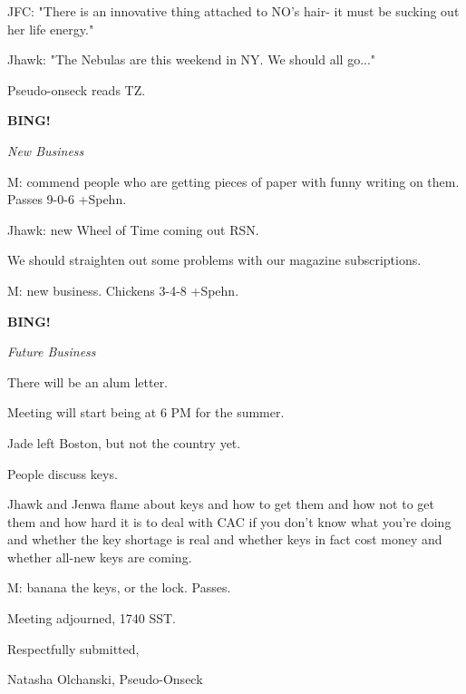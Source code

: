\documentclass[12pt]{article}
\newcommand{\bing}{{\bf BING!} }
\newcommand{\goto}[1]{\bing \vskip 12pt \centerline{{\em{#1}}}}
\begin{document}
JFC: "There is an innovative thing attached to NO's hair- it must be sucking out her life energy."

Jhawk: "The Nebulas are this weekend in NY. We should all go..."

Pseudo-onseck reads TZ.

\goto{New Business}

M: commend people who are getting pieces of paper with funny writing on them. Passes 9-0-6 +Spehn.

Jhawk: new Wheel of Time coming out RSN.

We should straighten out some problems with our magazine subscriptions.

M: new business. Chickens 3-4-8 +Spehn.

\goto{Future Business}

There will be an alum letter.

Meeting will start being at 6 PM for the summer.

Jade left Boston, but not the country yet.

People discuss keys.

Jhawk and Jenwa flame about keys and how to get them and how not to get them and how hard it is to deal with CAC if you don't know what you're doing and whether the key shortage is real and whether keys in fact cost money and whether all-new keys are coming.

M: banana the keys, or the lock. Passes.

\vspace{12pt}

\noindent
Meeting adjourned, 1740 SST.

\vspace{18pt}

\centerline{Respectfully submitted,}
\centerline{Natasha Olchanski, Pseudo-Onseck}
\end{document}
